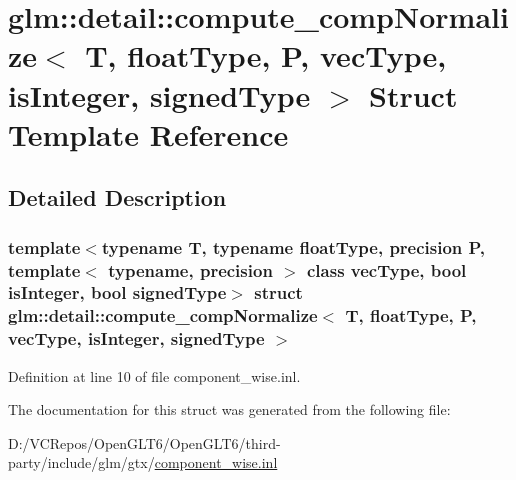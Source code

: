 \hypertarget{structglm_1_1detail_1_1compute__comp_normalize}{}\section{glm\+::detail\+::compute\+\_\+comp\+Normalize$<$ T, float\+Type, P, vec\+Type, is\+Integer, signed\+Type $>$ Struct Template Reference}
\label{structglm_1_1detail_1_1compute__comp_normalize}


\subsection{Detailed Description}
\subsubsection*{template$<$typename T, typename float\+Type, precision P, template$<$ typename, precision $>$ class vec\+Type, bool is\+Integer, bool signed\+Type$>$\newline
struct glm\+::detail\+::compute\+\_\+comp\+Normalize$<$ T, float\+Type, P, vec\+Type, is\+Integer, signed\+Type $>$}



Definition at line 10 of file component\+\_\+wise.\+inl.



The documentation for this struct was generated from the following file\+:\begin{DoxyCompactItemize}
\item 
D\+:/\+V\+C\+Repos/\+Open\+G\+L\+T6/\+Open\+G\+L\+T6/third-\/party/include/glm/gtx/\mbox{\hyperlink{component__wise_8inl}{component\+\_\+wise.\+inl}}\end{DoxyCompactItemize}

